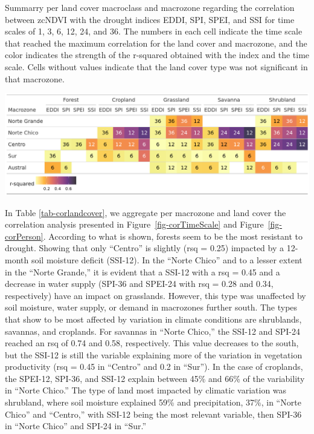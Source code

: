 \documentclass[
  authoryear,
  preprint,
  3p,
  onecolumn]{elsarticle}
\begin{document}
\begin{table}[!ht]
\caption{Summarry per land cover macroclass and macrozone regarding the correlation between zcNDVI with the drought indices EDDI, SPI, SPEI, and SSI for time scales of 1, 3, 6, 12, 24, and 36. The numbers in each cell indicate the time scale that reached the maximum correlation for the land cover and macrozone, and the color indicates the strength of the r-squared obtained with the index and the time scale. Cells without values indicate that the land cover type was not significant in that macrozone.}
\label{tab-corlandcover}
\includegraphics[]{../output/figs/tabla_r_cor_macro_indice.png}
\end{table}

In Table \ref{tab-corlandcover}, we aggregate per macrozone and land
cover the correlation analysis presented in
Figure~\ref{fig-corTimeScale} and Figure~\ref{fig-corPerson}. According
to what is shown, forests seem to be the most resistant to drought.
Showing that only ``Centro'' is slightly (rsq = 0.25) impacted by a
12-month soil moisture deficit (SSI-12). In the ``Norte Chico'' and to a
lesser extent in the ``Norte Grande,'' it is evident that a SSI-12 with
a rsq = 0.45 and a decrease in water supply (SPI-36 and SPEI-24 with rsq
= 0.28 and 0.34, respectively) have an impact on grasslands. However,
this type was unaffected by soil moisture, water supply, or demand in
macrozones further south. The types that show to be most affected by
variation in climate conditions are shrublands, savannas, and croplands.
For savannas in ``Norte Chico,'' the SSI-12 and SPI-24 reached an rsq of
0.74 and 0.58, respectively. This value decreases to the south, but the
SSI-12 is still the variable explaining more of the variation in
vegetation productivity (rsq = 0.45 in ``Centro'' and 0.2 in ``Sur'').
In the case of croplands, the SPEI-12, SPI-36, and SSI-12 explain
between 45\% and 66\% of the variability in ``Norte Chico.'' The type of
land most impacted by climatic variation was shrubland, where soil
moisture explained 59\% and precipitation, 37\%, in ``Norte Chico'' and
``Centro,'' with SSI-12 being the most relevant variable, then SPI-36 in
``Norte Chico'' and SPI-24 in ``Sur.''
\end{document}
